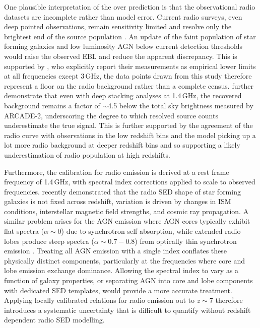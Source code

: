 \documentclass[
    a4paper, %
    10pt, %
    unnumberedsections, %
]{LTJournalArticle}
\begin{document}
One plausible interpretation of the over prediction is that the observational radio datasets are incomplete rather than model error. Current radio surveys, even deep pointed observations, remain sensitivity limited and resolve only the brightest end of the source population \parencite{condonResolvingRadioSource2012, zottiRadioMillimeterContinuum2010}. An update of the faint population of star forming galaxies and low luminosity AGN below current detection thresholds would raise the observed EBL and reduce the apparent discrepancy. This is supported by \cite{tompkinsCosmicRadioBackground2023}, who explicitly report their measurements as empirical lower limits at all frequencies except 3\,GHz, the data points drawn from this study therefore represent a floor on the radio background rather than a complete census. \cite{murphyExcessHighfrequencyRadio2018} further demonstrate that even with deep stacking analyses at 1.4\,GHz, the recovered background remains a factor of $\sim$4.5 below the total sky brightness measured by ARCADE-2, underscoring the degree to which resolved source counts underestimate the true signal. This is further supported by the agreement of the radio curve with observations in the low redshift bins and the model picking up a lot more radio background at deeper redshift bins and so supporting a likely underestimation of radio population at high redshifts.

Furthermore, the \cite{thomasRadioGalaxyPopulation2021} calibration for radio emission is derived at a rest frame frequency of 1.4\,GHz, with spectral index corrections applied to scale to observed frequencies. \cite{tabatabaeiRadioSpectralEnergy2025} recently demonstrated that the radio SED shape of star forming galaxies is not fixed across redshift, variation is driven by changes in ISM conditions, interstellar magnetic field strengths, and cosmic ray propagation. A similar problem arises for the AGN emission where AGN cores typically exhibit flat spectra ($\alpha \sim 0$) due to synchrotron self absorption, while extended radio lobes produce steep spectra ($\alpha \sim 0.7-0.8$) from optically thin synchrotron emission \parencite{condonRadioEmissionNormal1992}. Treating all AGN emission with a single index conflates these physically distinct components, particularly at the frequencies where core and lobe emission exchange dominance. Allowing the spectral index to vary as a function of galaxy properties, or separating AGN into core and lobe components with dedicated SED templates, would provide a more accurate treatment. Applying locally calibrated relations for radio emission out to $z \sim 7$ therefore introduces a systematic uncertainty that is difficult to quantify without redshift dependent radio SED modelling.
\end{document}
